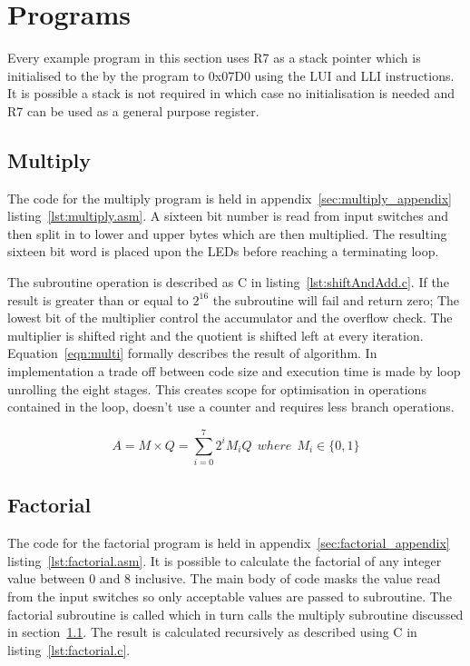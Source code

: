 

\section{Programs}
Every example program in this section uses R7 as a stack pointer which is initialised to the by the program to 0x07D0 using the LUI and LLI instructions.
It is possible a stack is not required in which case no initialisation is needed and R7 can be used as a general purpose register. 





\subsection{Multiply}
\label{sec:multiply}
The code for the multiply program is held in appendix~\ref{sec:multiply_appendix} listing~\ref{lst:multiply.asm}.
A sixteen bit number is read from input switches and then split in to lower and upper bytes which are then multiplied.
The resulting sixteen bit word is placed upon the LEDs before reaching a terminating loop.

The subroutine operation is described as C in listing~\ref{lst:shiftAndAdd.c}. 
If the result is greater than or equal to $2^{16}$ the subroutine will fail and return zero;
The lowest bit of the multiplier control the accumulator and the overflow check.
The multiplier is shifted right and the quotient is shifted left at every iteration.
Equation~\eqref{eqn:multi} formally describes the result of algorithm.
In implementation a trade off between code size and execution time is made by loop unrolling the eight stages.
This creates scope for optimisation in operations contained in the loop, doesn't use a counter and requires less branch operations.



\begin{equation}
   A = M \times Q = \sum_{i=0}^{7} 2^i M_i Q\:\:where\:\:M_i \in \{0,1\}
   \label{eqn:multi}
\end{equation}





\subsection{Factorial}
\label{sec:factorial}
The code for the factorial program is held in appendix~\ref{sec:factorial_appendix} listing~\ref{lst:factorial.asm}.
It is possible to calculate the factorial of any integer value between $0$ and $8$ inclusive.
The main body of code masks the value read from the input switches so only acceptable values are passed to subroutine.
The factorial subroutine is called which in turn calls the multiply subroutine discussed in section~\ref{sec:multiply}. 
The result is calculated recursively as described using C in listing~\ref{lst:factorial.c}. 


